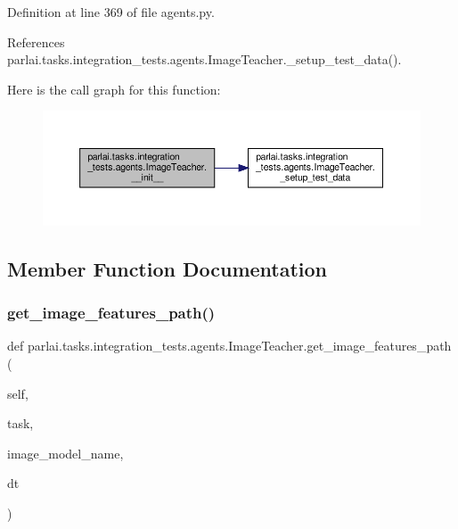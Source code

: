 Definition at line 369 of file agents.\+py.



References parlai.\+tasks.\+integration\+\_\+tests.\+agents.\+Image\+Teacher.\+\_\+setup\+\_\+test\+\_\+data().

Here is the call graph for this function\+:
\nopagebreak
\begin{figure}[H]
\begin{center}
\leavevmode
\includegraphics[width=350pt]{classparlai_1_1tasks_1_1integration__tests_1_1agents_1_1ImageTeacher_a3341d0d235586140b1c0c231a21182ff_cgraph}
\end{center}
\end{figure}


\subsection{Member Function Documentation}
\mbox{\label{classparlai_1_1tasks_1_1integration__tests_1_1agents_1_1ImageTeacher_a73c89a1d9f05891ad2a749c81814b93e}} 
\subsubsection{\texorpdfstring{get\+\_\+image\+\_\+features\+\_\+path()}{get\_image\_features\_path()}}
{\footnotesize\ttfamily def parlai.\+tasks.\+integration\+\_\+tests.\+agents.\+Image\+Teacher.\+get\+\_\+image\+\_\+features\+\_\+path (\begin{DoxyParamCaption}\item[{}]{self,  }\item[{}]{task,  }\item[{}]{image\+\_\+model\+\_\+name,  }\item[{}]{dt }\end{DoxyParamCaption})}

